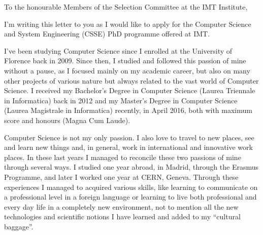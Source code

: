 \documentclass{article}
\begin{document}
    \hspace*{0.5\linewidth}
    
    To the honourable Members of the Selection Committee at the IMT Institute, \par \bigskip
    
    I'm writing this letter to you as I would like to apply for the Computer Science and System
    Engineering (CSSE) PhD programme offered at IMT. \par \bigskip
    
    I've been studying Computer Science since I enrolled at the University of Florence back in 2009. Since then, I studied and followed this passion of mine without a pause, as I focused mainly on my academic career, but also on many other projects of various nature but always related to the vast world of Computer Science. I received my Bachelor's Degree in Computer Science (Laurea Triennale in Informatica) back in 2012 and my Master's Degree in Computer Science (Laurea Magistrale in Informatica) recently, in April 2016, both with maximum score and honours (Magna Cum Laude). \par \bigskip
    
    Computer Science is not my only passion. I also love to travel to new places, see and learn new things and, in general, work in international and innovative work places. In these last years I managed to reconcile these two passions of mine through several ways. I studied one year abroad, in Madrid, through the Erasmus Programme, and later I worked one year at CERN, Geneva. Through these experiences I managed to acquired various skills, like learning to communicate on a professional level in a foreign language or learning to live both professional and every day life in a completely new environment, not to mention all the new technologies and scientific notions I have learned and added to my ``cultural baggage''. \par \bigskip
    
\end{document}
